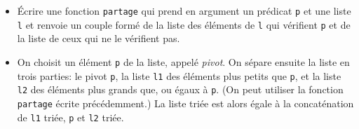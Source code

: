 \documentclass[11pt, a4paper]{article}
\begin{document}
\begin{itemize}

  \item[\textbf{C.1}] Écrire une fonction {\tt partage} qui prend
     en argument un prédicat {\tt p} et une liste {\tt l} et renvoie
     un couple formé de la liste des éléments de {\tt l} qui vérifient
     {\tt p} et de la liste de ceux qui ne le vérifient pas.

  \item[\textbf{C.2}] On choisit un élément {\tt p} de la liste,
     appelé \emph{pivot}. On sépare ensuite la liste en trois parties:
     le pivot {\tt p}, la liste {\tt l1} des éléments plus petits que
     {\tt p}, et la liste {\tt l2} des éléments plus grands que, ou
     égaux à {\tt p}. (On peut utiliser la fonction {\tt partage}
     écrite précédemment.)  La liste triée est alors égale à la
     concaténation de \texttt{l1} triée, {\tt p} et \texttt{l2} triée.

\end{itemize}
\end{document}
